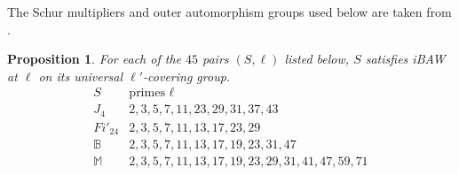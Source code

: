 \documentclass[10pt]{amsart}
\newtheorem{proposition}[theorem]{Proposition}
\theoremstyle{definition}
\newcommand{\Baby}{\mathbb B}
\newcommand{\Monster}{\mathbb M}
\numberwithin{equation}{section}
\numberwithin{table}{section}
\begin{document}
The Schur multipliers and outer automorphism groups used below are taken from
\cite[Table~1]{Atlas1985}.

\begin{proposition}\label{prop:four-boundary}
For each of the $45$ pairs $(S,\ell)$ listed below, $S$ satisfies iBAW at
$\ell$ on its universal $\ell'$-covering group.
\[
\begin{array}{c|c}
S&\text{primes }\ell\\
\hline
J_4&2,3,5,7,11,23,29,31,37,43\\
Fi'_{24}&2,3,5,7,11,13,17,23,29\\
\Baby&2,3,5,7,11,13,17,19,23,31,47\\
\Monster&2,3,5,7,11,13,17,19,23,29,31,41,47,59,71
\end{array}
\]
\end{proposition}
\end{document}
